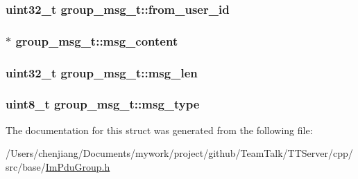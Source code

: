 \subsubsection[{from\+\_\+user\+\_\+id}]{\setlength{\rightskip}{0pt plus 5cm}uint32\+\_\+t group\+\_\+msg\+\_\+t\+::from\+\_\+user\+\_\+id}\label{structgroup__msg__t_a69258f7d7948f4f5cbfbc0414e9eca4b}
\hypertarget{structgroup__msg__t_af27f4b75488374434e977f79b48d044c}{}
\subsubsection[{msg\+\_\+content}]{$\ast$ group\+\_\+msg\+\_\+t\+::msg\+\_\+content}\label{structgroup__msg__t_af27f4b75488374434e977f79b48d044c}
\hypertarget{structgroup__msg__t_ab87b25244a68a26908ff87dc0a2bb949}{}
\subsubsection[{msg\+\_\+len}]{\setlength{\rightskip}{0pt plus 5cm}uint32\+\_\+t group\+\_\+msg\+\_\+t\+::msg\+\_\+len}\label{structgroup__msg__t_ab87b25244a68a26908ff87dc0a2bb949}
\hypertarget{structgroup__msg__t_a041f9b8689241e82a0b46242562f8be2}{}
\subsubsection[{msg\+\_\+type}]{\setlength{\rightskip}{0pt plus 5cm}uint8\+\_\+t group\+\_\+msg\+\_\+t\+::msg\+\_\+type}\label{structgroup__msg__t_a041f9b8689241e82a0b46242562f8be2}


The documentation for this struct was generated from the following file\+:\begin{DoxyCompactItemize}
\item 
/\+Users/chenjiang/\+Documents/mywork/project/github/\+Team\+Talk/\+T\+T\+Server/cpp/src/base/\hyperlink{_im_pdu_group_8h}{Im\+Pdu\+Group.\+h}\end{DoxyCompactItemize}
